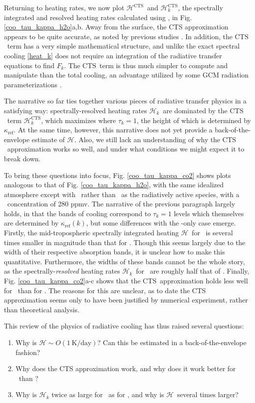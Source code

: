\documentclass[10pt]{article}
\newcommand{\ch}{\ensuremath{\mathcal{H}}}
\newcommand{\chk}{\ensuremath{\ch_k}}
\newcommand{\chcts}{\ensuremath{\mathcal{H}^\CTS}}
\newcommand{\chkcts}{\ensuremath{\ch_k^\CTS}}
\newcommand{\tauk}{\ensuremath{\tau_k}}
\newcommand{\CTS}{\ensuremath{\mathrm{CTS}}}
\newcommand{\kapparef}{\ensuremath{\kappa_{\mathrm{ref}}}}
\begin{document}
Returning to heating rates, we now plot \chcts\ and \chkcts, the spectrally integrated and resolved heating rates calculated using  ,  in Fig. \ref{coo_tau_kappa_h2o}a,b. Away from the surface, the CTS approximation appears to be quite accurate, as noted by previous studies \citep[e.g.][]{clough1992,rodgers1966}.  In addition, the \CTS\ term has a very simple mathematical structure,  and unlike the exact spectral cooling \eqref{heat_k} does not require an integration of the radiative transfer equations to find $F_k$. The \CTS\ term is thus much simpler to compute and manipulate than the total cooling, an advantage utilized by some GCM radiation parameterizations  \citep[e.g.][]{fels1980}.

The narrative so far ties together various pieces of radiative transfer physics in a satisfying way: spectrally-resolved heating rates \chk\ are dominated by the \CTS\ term \chkcts, which maximizes where $\tauk=1$, the height  of which is determined by \kapparef.  At the same time, however, this narrative does not yet provide a back-of-the-envelope estimate of \ch. Also, we still lack an understanding of why the \CTS\ approximation works so well, and under what conditions we might  expect it to break down.

To bring these questions into focus,  Fig. \ref{coo_tau_kappa_co2} shows plots analogous to that of Fig. \ref{coo_tau_kappa_h2o}, with the same idealized atmosphere except with \cotwo\ rather than \htwo\ as the radiatively active species, with a \cotwo\ concentration of 280 ppmv. The narrative of the previous paragraph largely holds, in that the bands of cooling correspond to $\tauk=1$ levels which themselves are determined by $\kapparef(k)$,  but some differences with the \htwo-only case emerge. Firstly, the mid-tropospheric spectrally integrated heating \ch\ for \cotwo\ is several  times smaller in magnitude than that for \htwo. Though this seems largely due to the width of their respective absorption bands, it is unclear how to make this  quantitative. Furthermore, the widths of these bands cannot be the whole story, as the spectrally-\emph{resolved} heating rates \chk\ for \cotwo\ are roughly half that of \htwo.  Finally, Fig. \ref{coo_tau_kappa_co2}a-c shows that the \CTS\ approximation holds less well for \cotwo\ than for \htwo. The reasons for this are unclear, as to date the CTS approximation seems only to have been justified by numerical experiment, rather than theoretical analysis. 

This review of the physics of radiative cooling has thus raised several questions:
\begin{enumerate}
	\item Why is $\ch\sim O(1\ \text{K/day})$? Can this be estimated in a back-of-the-envelope fashion? \label{Q_heating}
	\item Why does the CTS approximation work, and why does it work better for \htwo\ than \cotwo?	    \label{Q_cts}
	\item Why is $\ch_k$ twice as large for \htwo\ as for \cotwo, and why is \ch\ several times larger?		\label{Q_contrast}
\end{enumerate}
\end{document}
